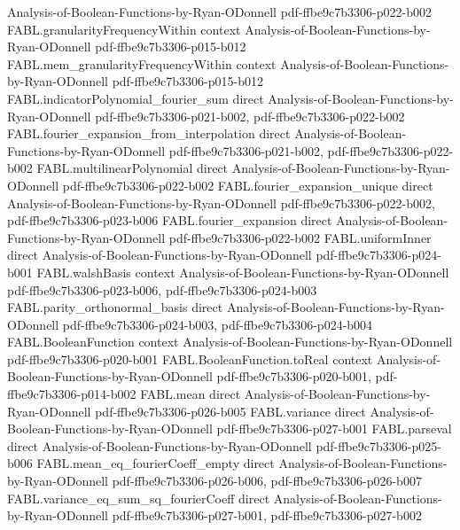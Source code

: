 \begin{theorem}
  {Analysis-of-Boolean-Functions-by-Ryan-ODonnell}
  {pdf-ffbe9c7b3306-p022-b002}
\proofstep
  {FABL.granularityFrequencyWithin}
  {context}
  {Analysis-of-Boolean-Functions-by-Ryan-ODonnell}
  {pdf-ffbe9c7b3306-p015-b012}
\proofstep
  {FABL.mem_granularityFrequencyWithin}
  {context}
  {Analysis-of-Boolean-Functions-by-Ryan-ODonnell}
  {pdf-ffbe9c7b3306-p015-b012}
\proofstep
  {FABL.indicatorPolynomial_fourier_sum}
  {direct}
  {Analysis-of-Boolean-Functions-by-Ryan-ODonnell}
  {pdf-ffbe9c7b3306-p021-b002,
    pdf-ffbe9c7b3306-p022-b002}
\proofstep
  {FABL.fourier_expansion_from_interpolation}
  {direct}
  {Analysis-of-Boolean-Functions-by-Ryan-ODonnell}
  {pdf-ffbe9c7b3306-p021-b002,
    pdf-ffbe9c7b3306-p022-b002}
\proofstep
  {FABL.multilinearPolynomial}
  {direct}
  {Analysis-of-Boolean-Functions-by-Ryan-ODonnell}
  {pdf-ffbe9c7b3306-p022-b002}
\proofstep
  {FABL.fourier_expansion_unique}
  {direct}
  {Analysis-of-Boolean-Functions-by-Ryan-ODonnell}
  {pdf-ffbe9c7b3306-p022-b002,
    pdf-ffbe9c7b3306-p023-b006}
\proofstep
  {FABL.fourier_expansion}
  {direct}
  {Analysis-of-Boolean-Functions-by-Ryan-ODonnell}
  {pdf-ffbe9c7b3306-p022-b002}
\proofstep
  {FABL.uniformInner}
  {direct}
  {Analysis-of-Boolean-Functions-by-Ryan-ODonnell}
  {pdf-ffbe9c7b3306-p024-b001}
\proofstep
  {FABL.walshBasis}
  {context}
  {Analysis-of-Boolean-Functions-by-Ryan-ODonnell}
  {pdf-ffbe9c7b3306-p023-b006,
    pdf-ffbe9c7b3306-p024-b003}
\proofstep
  {FABL.parity_orthonormal_basis}
  {direct}
  {Analysis-of-Boolean-Functions-by-Ryan-ODonnell}
  {pdf-ffbe9c7b3306-p024-b003,
    pdf-ffbe9c7b3306-p024-b004}
\proofstep
  {FABL.BooleanFunction}
  {context}
  {Analysis-of-Boolean-Functions-by-Ryan-ODonnell}
  {pdf-ffbe9c7b3306-p020-b001}
\proofstep
  {FABL.BooleanFunction.toReal}
  {context}
  {Analysis-of-Boolean-Functions-by-Ryan-ODonnell}
  {pdf-ffbe9c7b3306-p020-b001,
    pdf-ffbe9c7b3306-p014-b002}
\proofstep
  {FABL.mean}
  {direct}
  {Analysis-of-Boolean-Functions-by-Ryan-ODonnell}
  {pdf-ffbe9c7b3306-p026-b005}
\proofstep
  {FABL.variance}
  {direct}
  {Analysis-of-Boolean-Functions-by-Ryan-ODonnell}
  {pdf-ffbe9c7b3306-p027-b001}
\proofstep
  {FABL.parseval}
  {direct}
  {Analysis-of-Boolean-Functions-by-Ryan-ODonnell}
  {pdf-ffbe9c7b3306-p025-b006}
\proofstep
  {FABL.mean_eq_fourierCoeff_empty}
  {direct}
  {Analysis-of-Boolean-Functions-by-Ryan-ODonnell}
  {pdf-ffbe9c7b3306-p026-b006,
    pdf-ffbe9c7b3306-p026-b007}
\proofstep
  {FABL.variance_eq_sum_sq_fourierCoeff}
  {direct}
  {Analysis-of-Boolean-Functions-by-Ryan-ODonnell}
  {pdf-ffbe9c7b3306-p027-b001,
    pdf-ffbe9c7b3306-p027-b002}

\end{theorem}
